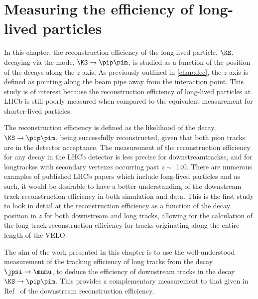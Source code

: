 \chapter{Measuring the efficiency of long-lived particles}
\label{chap:ks}
In this chapter, the reconstruction efficiency of the long-lived particle, $\KS$, decaying via the mode, $\KS\to\pip\pim$, is studied as a function of the position of the \KS decays along the $z$-axis. As previously outlined in \autoref{chap:dec}, the $z$-axis is defined as pointing along the beam pipe away from the interaction point. This study is of interest because the reconstruction efficiency of long-lived particles at LHCb is still poorly measured when compared to the equivalent measurement for shorter-lived particles.


The reconstruction efficiency is defined as the likelihood of the decay, $\KS\to\pip\pim$, being successfully reconstructed, given that both pion tracks are in the detector acceptance. The measurement of the reconstruction efficiency for any decay in the LHCb detector is less precise for \glspl{downstreamtracks}, and for \glspl{longtracks} with secondary vertexes occurring past $z \sim$ 140\mm. There are numerous examples of published LHCb papers which include long-lived particles \cite{LHCb-PAPER-2010-001,LHCb-PAPER-2011-005,LHCb-PAPER-2011-041,LHCb-PAPER-2012-011,LHCb-PAPER-2012-016,LHCb-PAPER-2012-023,LHCb-PAPER-2012-027,LHCb-PAPER-2012-035,LHCb-PAPER-2012-052,LHCb-PAPER-2012-057,LHCb-PAPER-2013-015,LHCb-PAPER-2013-025,LHCb-PAPER-2013-034,LHCb-PAPER-2013-042} and as such, it would be desirable to have a better understanding of the downstream track reconstruction efficiency in both simulation and data. This is the first study to look in detail at the reconstruction efficiency as a function of the decay position in $z$ for both downstream and long tracks, allowing for the calculation of the long track reconstruction efficiency for tracks originating along the entire length of the \gls{VELO}.

The aim of the work presented in this chapter is to use the well-understood measurement of the tracking efficiency of long tracks from the decay $\jpsi\to\mumu$, to deduce the efficiency of downstream tracks in the decay $\KS\to\pip\pim$. This provides a complementary measurement to that given in Ref~\cite{DDpat} of the downstream reconstruction efficiency. %



